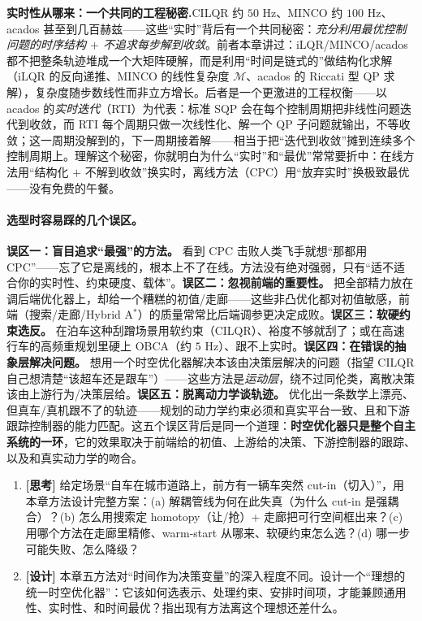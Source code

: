 \begin{insight}
\textbf{实时性从哪来：一个共同的工程秘密.}\;CILQR 约 $50$ Hz、MINCO 约 $100$ Hz、acados 甚至到几百赫兹——这些“实时”背后有一个共同秘密：\emph{充分利用最优控制问题的时序结构 $+$ 不追求每步解到收敛}。前者本章讲过：iLQR/MINCO/acados 都不把整条轨迹堆成一个大矩阵硬解，而是利用“时间是链式的”做结构化求解（iLQR 的反向递推、MINCO 的线性复杂度 $\mathcal M$、acados 的 Riccati 型 QP 求解），复杂度随步数线性而非立方增长。后者是一个更激进的工程权衡——以 acados 的\emph{实时迭代}（RTI）为代表：标准 SQP 会在每个控制周期把非线性问题迭代到收敛，而 RTI 每个周期只做一次线性化、解一个 QP 子问题就输出，不等收敛；这一周期没解到的，下一周期接着解——相当于把“迭代到收敛”摊到连续多个控制周期上。理解这个秘密，你就明白为什么“实时”和“最优”常常要折中：在线方法用“结构化 $+$ 不解到收敛”换实时，离线方法（CPC）用“放弃实时”换极致最优——没有免费的午餐。
\end{insight}

\paragraph{选型时容易踩的几个误区。}
\textbf{误区一：盲目追求“最强”的方法。} 看到 CPC 击败人类飞手就想“那都用 CPC”——忘了它是离线的，根本上不了在线。方法没有绝对强弱，只有“适不适合你的实时性、约束硬度、载体”。\textbf{误区二：忽视前端的重要性。} 把全部精力放在调后端优化器上，却给一个糟糕的初值/走廊——这些非凸优化都对初值敏感，前端（搜索/走廊/Hybrid A$^*$）的质量常常比后端调参更决定成败。\textbf{误区三：软硬约束选反。} 在泊车这种刮蹭场景用软约束（CILQR）、裕度不够就刮了；或在高速行车的高频重规划里硬上 OBCA（约 $5$ Hz）、跟不上实时。\textbf{误区四：在错误的抽象层解决问题。} 想用一个时空优化器解决本该由决策层解决的问题（指望 CILQR 自己想清楚“该超车还是跟车”）——这些方法是\emph{运动层}，绕不过同伦类，离散决策该由上游行为/决策层给。\textbf{误区五：脱离动力学谈轨迹。} 优化出一条数学上漂亮、但真车/真机跟不了的轨迹——规划的动力学约束必须和真实平台一致、且和下游跟踪控制器的能力匹配。这五个误区背后是同一个道理：\textbf{时空优化器只是整个自主系统的一环}，它的效果取决于前端给的初值、上游给的决策、下游控制器的跟踪、以及和真实动力学的吻合。

\begin{practice}
\begin{enumerate}
  \item \textbf{[思考]} 给定场景“自车在城市道路上，前方有一辆车突然 cut-in（切入）”，用本章方法设计完整方案：(a) 解耦管线为何在此失真（为什么 cut-in 是强耦合）？(b) 怎么用搜索定 homotopy（让/抢）+ 走廊把可行空间框出来？(c) 用哪个方法在走廊里精修、warm-start 从哪来、软硬约束怎么选？(d) 哪一步可能失败、怎么降级？
  \item \textbf{[设计]} 本章五方法对“时间作为决策变量”的深入程度不同。设计一个“理想的统一时空优化器”：它该如何选表示、处理约束、安排时间项，才能兼顾通用性、实时性、和时间最优？指出现有方法离这个理想还差什么。
\end{enumerate}
\end{practice}

